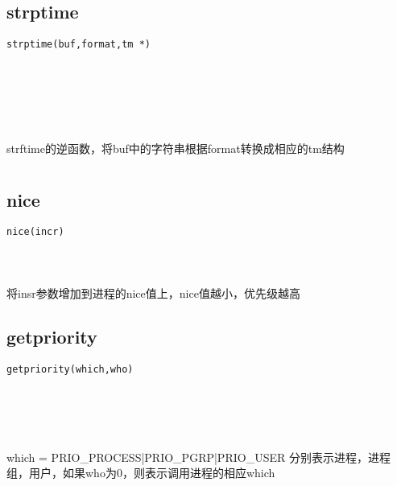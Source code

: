 \documentclass[10pt,a4paper]{article}
\begin{document}
\subsection{strptime}
\begin{spacing}{2.0}
\lstset{language=C,numbers=none}
\begin{lstlisting}
strptime(buf,format,tm *)
\end{lstlisting}
{\large\color[rgb]{0.2,0.4,0.6}{buf:}} \\
{\large\color[rgb]{0.2,0.4,0.6}{format:}} \\
{\large\color[rgb]{0.2,0.4,0.6}{*:}}
\paragraph{ \ \ }strftime的逆函数，将buf中的字符串根据format转换成相应的tm结构
\end{spacing}

\section{\color[rgb]{0.2,0.4,0.6}{进程优先级}}
\subsection{nice}
\begin{spacing}{2.0}
\lstset{language=C,numbers=none}
\begin{lstlisting}
nice(incr)
\end{lstlisting}
{\large\color[rgb]{0.2,0.4,0.6}{incr:}}
\paragraph{ \ \ }将insr参数增加到进程的nice值上，nice值越小，优先级越高
\end{spacing}

\subsection{getpriority}
\begin{spacing}{2.0}
\lstset{language=C,numbers=none}
\begin{lstlisting}
getpriority(which,who)
\end{lstlisting}
{\large\color[rgb]{0.2,0.4,0.6}{which:}} \\
{\large\color[rgb]{0.2,0.4,0.6}{who:}}
\paragraph{ \ \ }which = PRIO\_PROCESS|PRIO\_PGRP|PRIO\_USER 分别表示进程，进程组，用户，如果who为0，则表示调用进程的相应which
\end{spacing}
\end{document}
